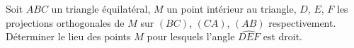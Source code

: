 Soit $ABC$ un triangle équilatéral, $M$ un point intérieur au triangle, $D$, $E$, $F$ les projections orthogonales de $M$ sur $(BC)$, $(CA)$, $(AB)$ respectivement. Déterminer le lieu des points $M$ pour lesquels l'angle $\widehat{DEF}$ est droit.
